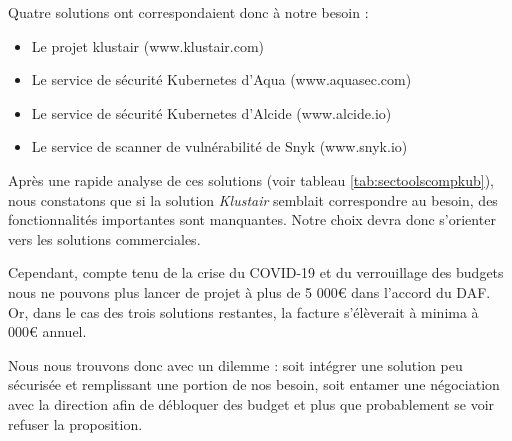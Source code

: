 Quatre solutions ont correspondaient donc à notre besoin :
\begin{itemize}
    \item Le projet klustair (www.klustair.com)
    \item Le service de sécurité Kubernetes d'Aqua (www.aquasec.com)
    \item Le service de sécurité Kubernetes d'Alcide (www.alcide.io)
    \item Le service de scanner de vulnérabilité de Snyk (www.snyk.io)
\end{itemize}

Après une rapide analyse de ces solutions (voir tableau \ref{tab:sectoolscompkub}), nous constatons que si la solution 
\emph{Klustair} semblait correspondre au besoin, des fonctionnalités importantes sont manquantes. Notre choix devra donc
s'orienter vers les solutions commerciales.

Cependant, compte tenu de la crise du COVID-19 et du verrouillage des budgets nous ne pouvons plus lancer de projet à 
plus de 5 000€ dans l'accord du \ac{DAF}. Or, dans le cas des trois solutions restantes, la facture s'élèverait à minima
à  000€ annuel.

Nous nous trouvons donc avec un dilemme : soit intégrer une solution peu sécurisée et remplissant une portion de nos 
besoin, soit entamer une négociation avec la direction afin de débloquer des budget et plus que probablement se voir 
refuser la proposition.
\newpage 

